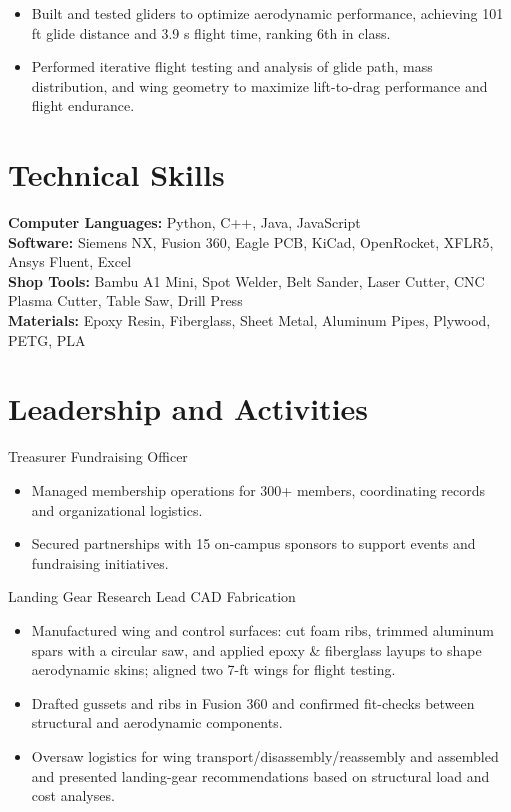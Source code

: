 \begin{itemize}
  \item Built and tested gliders to optimize aerodynamic performance, achieving 101 ft glide distance and 3.9 s flight time, ranking 6th in class.
  \item Performed iterative flight testing and analysis of glide path, mass distribution, and wing geometry to maximize lift-to-drag performance and flight endurance.
\end{itemize}

\section{Technical Skills}
\textbf{Computer Languages:} Python, C++, Java, JavaScript\\
\textbf{Software:} Siemens NX, Fusion 360, Eagle PCB, KiCad, OpenRocket, XFLR5, Ansys Fluent, Excel\\
\textbf{Shop Tools:} Bambu A1 Mini, Spot Welder, Belt Sander, Laser Cutter, CNC Plasma Cutter, Table Saw, Drill Press\\
\textbf{Materials:} Epoxy Resin, Fiberglass, Sheet Metal, Aluminum Pipes, Plywood, PETG, PLA

\section{Leadership and Activities}

Treasurer \textbar{} Fundraising Officer
\begin{itemize}
  \item Managed membership operations for 300+ members, coordinating records and organizational logistics.
  \item Secured partnerships with 15 on-campus sponsors to support events and fundraising initiatives.
\end{itemize}
\entrygap

Landing Gear Research Lead \textbar{} CAD \textbar{} Fabrication
\begin{itemize}
  \item Manufactured wing and control surfaces: cut foam ribs, trimmed aluminum spars with a circular saw, and applied epoxy \& fiberglass layups to shape aerodynamic skins; aligned two 7-ft wings for flight testing.
  \item Drafted gussets and ribs in Fusion 360 and confirmed fit-checks between structural and aerodynamic components.
  \item Oversaw logistics for wing transport/disassembly/reassembly and assembled and presented landing-gear recommendations based on structural load and cost analyses.
\end{itemize}


